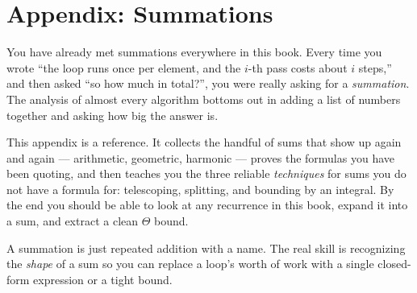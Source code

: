 \chapter{Appendix: Summations}
\label{ch37:summations}

You have already met summations everywhere in this book. Every time you wrote
``the loop runs once per element, and the $i$-th pass costs about $i$ steps,''
and then asked ``so how much in total?'', you were really asking for a
\emph{summation}. The analysis of almost every algorithm bottoms out in adding a
list of numbers together and asking how big the answer is.

This appendix is a reference. It collects the handful of sums that show up again
and again --- arithmetic, geometric, harmonic --- proves the formulas you have
been quoting, and then teaches you the three reliable \emph{techniques} for
sums you do not have a formula for: telescoping, splitting, and bounding by an
integral. By the end you should be able to look at any recurrence in this book,
expand it into a sum, and extract a clean $\Theta$ bound.

\begin{focusbox}
A summation is just repeated addition with a name. The real skill is
recognizing the \emph{shape} of a sum so you can replace a loop's worth of
work with a single closed-form expression or a tight bound.
\end{focusbox}

